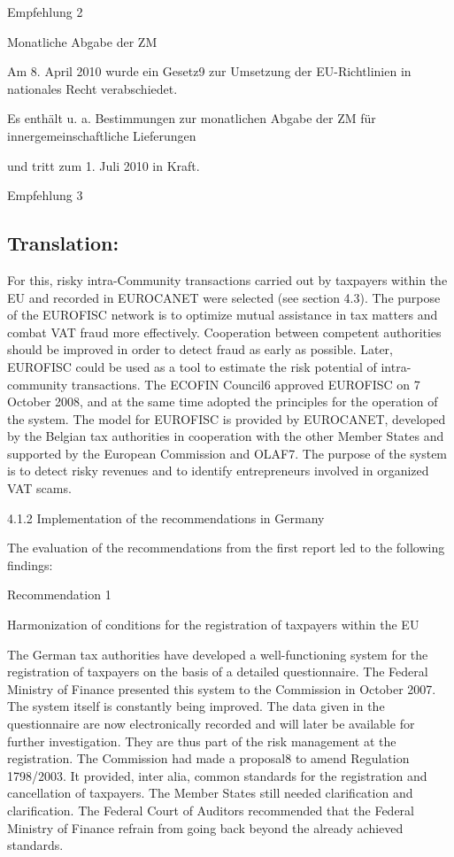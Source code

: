 \documentclass[10pt]{article}
\begin{document}
Empfehlung 2



Monatliche Abgabe der ZM

Am 8. April 2010 wurde ein Gesetz9 zur Umsetzung der EU-Richtlinien in nationales Recht verabschiedet.


Es enthält u. a. Bestimmungen zur monatlichen Abgabe der ZM für innergemeinschaftliche Lieferungen

und tritt zum 1. Juli 2010 in Kraft.


Empfehlung 3



\pagebreak

\subsection*{Translation:}

For this, risky intra-Community transactions carried out by taxpayers within the EU and recorded in EUROCANET were selected (see section 4.3).
The purpose of the EUROFISC network is to optimize mutual assistance in tax matters and combat VAT fraud more effectively. Cooperation between competent authorities should be improved in order to detect fraud as early as possible.
Later, EUROFISC could be used as a tool to estimate the risk potential of intra-community transactions.
The ECOFIN Council6 approved EUROFISC on 7 October 2008, and at the same time adopted the principles for the operation of the system.
The model for EUROFISC is provided by EUROCANET, developed by the Belgian tax authorities in cooperation with the other Member States and supported by the European Commission and OLAF7.
The purpose of the system is to detect risky revenues and to identify entrepreneurs involved in organized VAT scams.


4.1.2 Implementation of the recommendations in Germany



The evaluation of the recommendations from the first report led to the following findings:



Recommendation 1



Harmonization of conditions for the registration of taxpayers within the EU

The German tax authorities have developed a well-functioning system for the registration of taxpayers on the basis of a detailed questionnaire.
The Federal Ministry of Finance presented this system to the Commission in October 2007.
The system itself is constantly being improved.
The data given in the questionnaire are now electronically recorded and will later be available for further investigation. They are thus part of the risk management at the registration.
The Commission had made a proposal8 to amend Regulation 1798/2003. It provided, inter alia, common standards for the registration and cancellation of taxpayers.
The Member States still needed clarification and clarification.
The Federal Court of Auditors recommended that the Federal Ministry of Finance refrain from going back beyond the already achieved standards.
\end{document}
